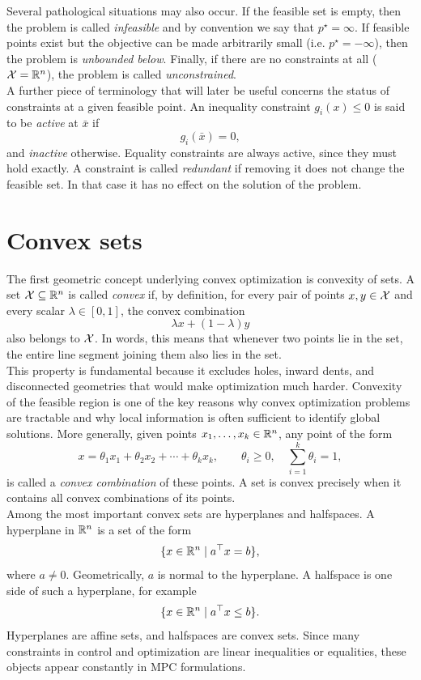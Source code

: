 Several pathological situations may also occur. If the feasible set is empty, then the problem is called \emph{infeasible} and by convention we say that $p^\star = \infty$. If feasible points exist but the objective can be made arbitrarily small (i.e. $p^\star = -\infty$), then the problem is \emph{unbounded below}. Finally, if there are no constraints at all ($\mathcal{X} = \mathbb{R}^n$), the problem is called \emph{unconstrained}.\\

A further piece of terminology that will later be useful concerns the status of constraints at a given feasible point. An inequality constraint \(g_i(x)\le 0\) is said to be \emph{active} at \(\bar x\) if
\[
g_i(\bar x)=0,
\]
and \emph{inactive} otherwise. Equality constraints are always active, since they must hold exactly. A constraint is called \emph{redundant} if removing it does not change the feasible set. In that case it has no effect on the solution of the problem.

\section{Convex sets}

The first geometric concept underlying convex optimization is convexity of sets. A set \(\mathcal{X}\subseteq \mathbb{R}^n\) is called \emph{convex} if, by definition, for every pair of points \(x,y\in\mathcal{X}\) and every scalar \(\lambda\in[0,1]\), the convex combination
\[
\lambda x + (1-\lambda)y
\]
also belongs to \(\mathcal{X}\). In words, this means that whenever two points lie in the set, the entire line segment joining them also lies in the set.\\

This property is fundamental because it excludes holes, inward dents, and disconnected geometries that would make optimization much harder. Convexity of the feasible region is one of the key reasons why convex optimization problems are tractable and why local information is often sufficient to identify global solutions.
More generally, given points \(x_1,\dots,x_k\in\mathbb{R}^n\), any point of the form
\[
x = \theta_1 x_1 + \theta_2 x_2 + \cdots + \theta_k x_k,
\qquad
\theta_i\ge 0,\quad \sum_{i=1}^k \theta_i = 1,
\]
is called a \emph{convex combination} of these points. A set is convex precisely when it contains all convex combinations of its points.\\
Among the most important convex sets are hyperplanes and halfspaces. A hyperplane in \(\mathbb{R}^n\) is a set of the form
\[
\{x\in\mathbb{R}^n \mid a^\top x = b\},
\]
where \(a\neq 0\). Geometrically, \(a\) is normal to the hyperplane. A halfspace is one side of such a hyperplane, for example
\[
\{x\in\mathbb{R}^n \mid a^\top x \le b\}.
\]
Hyperplanes are affine sets, and halfspaces are convex sets. Since many constraints in control and optimization are linear inequalities or equalities, these objects appear constantly in MPC formulations.\\

